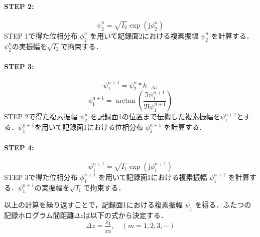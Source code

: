\paragraph{STEP 2:}
\begin{equation}
    \psi_2^n = \sqrt{I_2} \exp{(\mathrm{j}\phi_2^n)}
\end{equation}
STEP 1で得た位相分布 $\phi_2^n$ を用いて記録面2における複素振幅 $\psi_2^n$ を計算する．$\psi_2^n$の実振幅を$\sqrt{I_2}$で拘束する．

\paragraph{STEP 3:}
\begin{equation}
    \psi_1^{n+1} = \psi_2^n * h_{-\Delta z}
\end{equation}
\begin{equation}
    \phi_1^{n+1} = \arctan{\left( \frac{\Im \psi_1^{n+1}}{\Re \psi_1^{n+1}} \right)}
\end{equation}
STEP 2で得た複素振幅 $\psi_2^n$ を記録面1の位置まで伝搬した複素振幅を$\psi_1^{n+1}$とする．$\psi_1^{n+1}$を用いて記録面1における位相分布 $\phi_1^{n+1}$ を計算する．

\paragraph{STEP 4:}
\begin{equation}
    \psi_1^{n+1} = \sqrt{I_1} \exp{(\mathrm{j}\phi_1^{n+1})}
\end{equation}
STEP 3で得た位相分布 $\phi_1^{n+1}$ を用いて記録面1における複素振幅 $\psi_1^{n+1}$ を計算する．$\psi_1^{n+1}$の実振幅を$\sqrt{I_1}$で拘束する．

\vspace{10pt}
以上の計算を繰り返すことで，記録面1における複素振幅 $\psi_1$ を得る．ふたつの記録ホログラム間距離$\Delta z$は以下の式から決定する\cite{tanaka2016}．
\begin{equation}
    \Delta z = \frac{z_1}{m}, \quad ( m = 1,2,3,\cdots )
\end{equation}


